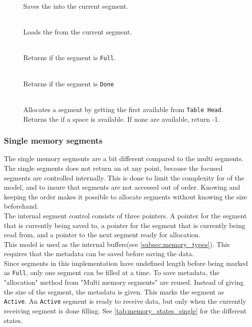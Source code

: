 \begin{description}
  \item[{}]\hfill

  Saves the  into the current segment.

  \item[]\hfill\\
  Loads the  from the current segment.

  \item[]\hfill\\
  Returns if the segment is \texttt{Full}.

  \item[]\hfill\\
    Returns if the segment is \texttt{Done}

  \item[]\hfill\\
  Allocates a segment by getting the first available from \texttt{Table Head}.
  Returns the  if a space is available.
  If none are available, return -1.
\end{description}




\subsubsection{Single memory segments}
The single memory segments are a bit different compared to the multi segments.
The single segments does not return an  at any point,
because the focused segments are controlled internally. This is done to limit
the complexity for of the model, and to insure that segments are not accessed
out of order. Knowing and keeping the order makes it possible to allocate
segments without knowing the size beforehand.\\
The internal segment control
consists of three pointers. A pointer for the segment that is currently being
saved to, a pointer for the segment that is currently being read from, and
a pointer to the next segment ready for allocation.\\
This model is used as the internal buffers(see \autoref{subsec:memory_types}).
This requires that the metadata can be saved before saving the data.\\
Since segments in this implementation have undefined length before being marked
as \texttt{Full}, only one segment can be filled at a time. To save metadata,
the "allocation" method from "Multi memory segments" are reused. Instead
of giving the size of the segment, the metadata is given. This marks the segment
as \texttt{Active}. An \texttt{Active} segment is ready to receive data, but only
when the currently receiving segment is done filling. See
\autoref{tab:memory_states_single} for the different states.\\

